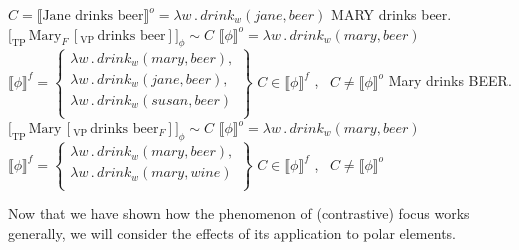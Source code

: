 \documentclass[output=paper,colorlinks,citecolor=brown]{langscibook}
\begin{document}
\is{}
\ea $C = \llbracket \text{Jane drinks beer} \rrbracket ^ o = \lambda w \, . \, drink_w(jane, beer)$\label{Foc.Contr.Antec}
\z
\il{}
\is{}
\ea MARY drinks beer.\label{Contr.Req.Fel}
    \ea ${[}_{\text{TP}} \, \text{Mary}_{F} \, [_{\text{VP}} \, \text{drinks beer}]]_{\phi} \sim C$ 
    \ex $\llbracket \phi \rrbracket^{o} = \lambda w \, . \, drink_w(mary, beer)$ \\
        $\llbracket \phi \rrbracket^{f} = \left\{ \begin{array}{l}
            \lambda w \, . \, drink_w(mary,beer), \\ 
            \lambda w \, . \,drink_w(jane,beer), \\ 
            \lambda w \, . \,drink_w(susan,beer) \\ 
            \end{array} \right\}  $
    \ex $C \in  \llbracket \phi \rrbracket ^f$ \cmark, \, $C \ne \llbracket \phi  \rrbracket ^o$ \cmark 
    \z
\z
\il{}
\is{}
\ea Mary drinks BEER.\label{Contr.Req.Infel}
    \ea ${[}_{\text{TP}} \, \text{Mary} \, [_{\text{VP}} \, \text{drinks beer}_{F}]]_{\phi} \sim C$
    \ex $\llbracket \phi \rrbracket^{o} = \lambda w \, . \, drink_w(mary, beer)$ \\
        $\llbracket \phi \rrbracket^{f} = \left\{ \begin{array}{l}
            \lambda w \, . \, drink_w(mary,beer), \\ 
            \lambda w \, . \,drink_w(mary,wine) \\ 
            \end{array} \right\}  $
    \ex $C \in  \llbracket \phi \rrbracket ^f$ \xmark, \, $C \ne \llbracket \phi  \rrbracket ^o$ \cmark 
    \z
\z
\il{}

Now that we have shown how the phenomenon of (contrastive) focus works generally, we will consider the effects of its application to polar elements. 
\end{document}
